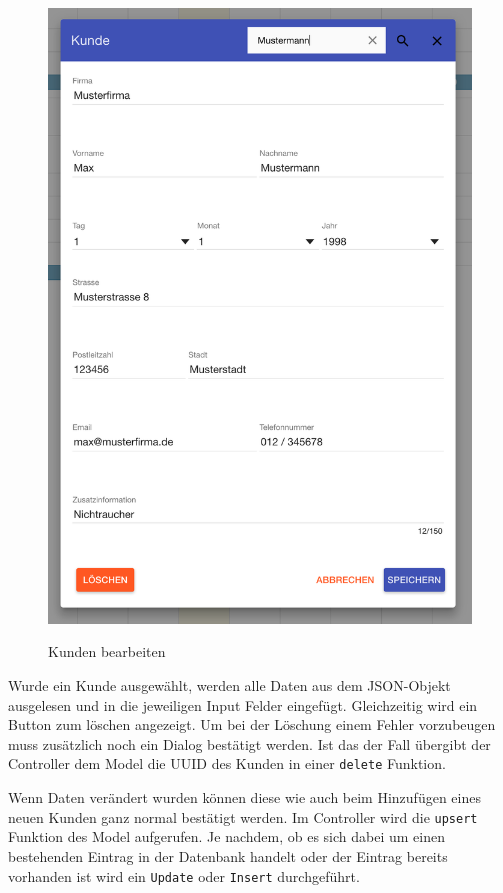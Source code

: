 \begin{figure}[H]
\begin{minipage}[t]{0.49\linewidth}
        \includegraphics[width=\linewidth]{images/frontend_customer_edit.png}
        \label{frontend_customer_edit}
        \caption{Kunden bearbeiten}
    \end{minipage}
\end{figure}

Wurde ein Kunde ausgewählt, werden alle Daten aus dem JSON-Objekt ausgelesen und in die jeweiligen Input Felder eingefügt.
Gleichzeitig wird ein Button zum löschen angezeigt. Um bei der Löschung einem Fehler vorzubeugen muss zusätzlich noch ein Dialog bestätigt werden.
Ist das der Fall übergibt der Controller dem Model die UUID des Kunden in einer \texttt{delete} Funktion.

Wenn Daten verändert wurden können diese wie auch beim Hinzufügen eines neuen Kunden ganz normal bestätigt werden.
Im Controller wird die \texttt{upsert} Funktion des Model aufgerufen. Je nachdem, ob es sich dabei um einen bestehenden
Eintrag in der Datenbank handelt oder der Eintrag bereits vorhanden ist wird ein \texttt{Update} oder \texttt{Insert} durchgeführt.

